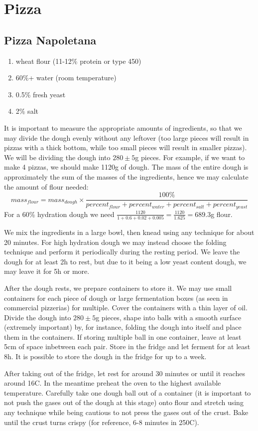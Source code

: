 \chapter{Pizza}
\section{Pizza Napoletana}

\begin{enumerate}
  \item wheat flour (11-12\% protein or type 450)
  \item 60\%+ water (room temperature)
  \item 0.5\% fresh yeast
  \item 2\% salt
\end{enumerate}

It is important to measure the appropriate amounts of ingredients, so that we
may divide the dough evenly without any leftover (too large pieces will result
in pizzas with a thick bottom, while too small pieces will result in smaller
pizzas). We will be dividing the dough into $280 \pm 5$g pieces. For example,
if we want to make 4 pizzas, we should make 1120g of dough. The mass of the
  entire dough is approximately the sum of the masses of the ingredients, hence
  we may calculate the amount of flour needed:
$$
mass_{flour} = mass_{dough} \times \frac{100\%}{ percent_{flour} + percent_{water} + percent_{salt} + percent_{yeast} }
$$
For a 60\% hydration dough we need $\frac{1120}{1 + 0.6 + 0.02 + 0.005} =
\frac{1120}{1.625} = 689.3$g flour.

We mix the ingredients in a large bowl, then knead using any technique for
about 20 minutes. For high hydration dough we may instead choose the folding
technique and perform it periodically during the resting period. We leave the
dough for at least 2h to rest, but due to it being a low yeast content dough,
we may leave it for 5h or more.

After the dough rests, we prepare containers to store it. We may use small
containers for each piece of dough or large fermentation boxes (as seen in
commercial pizzerias) for multiple. Cover the containers with a thin layer of
oil. Divide the dough into $280 \pm 5$g pieces, shape into balls with a smooth
surface (extremely important) by, for instance, folding the dough into itself
and place them in the containers. If storing multiple ball in one container,
leave at least 5cm of space inbetween each pair. Store in the fridge and let
ferment for at least 8h. It is possible to store the dough in the fridge for up
to a week.

After taking out of the fridge, let rest for around 30 minutes or until it
reaches around 16C. In the meantime preheat the oven to the highest available
temperature. Carefully take one dough ball out of a container (it is important
to not push the gases out of the dough at this stage) onto flour and stretch
using any technique while being cautious to not press the gases out of the
crust. Bake until the crust turns crispy (for reference, 6-8 minutes in 250C).
